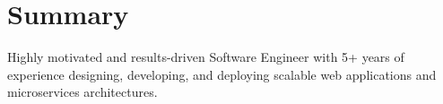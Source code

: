 
\section{Summary}
Highly motivated and results-driven Software Engineer with 5+ years of experience designing, developing, and deploying scalable web applications and microservices architectures.
